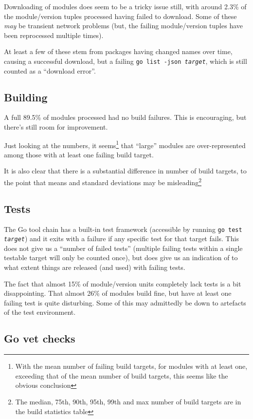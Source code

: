 \documentclass[a4paper]{paper}
\begin{document}
Downloading of modules does seem to be a tricky issue still, with
around 2.3\% of the module/version tuples processed having failed to
download. Some of these {\em may} be transient network problems (but, the
failing module/version tuples have been reprocessed multiple times).

At least a few of these stem from packages having changed names over
time, causing a successful download, but a failing {\tt go list -json
  {\it target}}, which is still counted as a ``download error''.

\subsection{Building}

A full 89.5\% of modules processed had no build failures. This is
encouraging, but there's still room for improvement.

Just looking at the numbers, it seems\footnote{With the mean number of
  failing build targets, for modules with at least one, exceeding that
  of the mean number of build targets, this seems like the obvious
  conclusion} that ``large'' modules are over-represented among those
with at least one failing build target.

It is also clear that there is a substantial difference in number of
build targets, to the point that means and standard deviations may be
misleading\footnote{The median, 75th, 90th, 95th, 99th and max number of build targets are in the build statistics table}

\subsection{Tests}

The Go tool chain has a built-in test framework (accessible by running
{\tt go test {\it target}}) and it exits with a failure if any
specific test for that target fails. This does not give us a ``number
of failed tests'' (multiple failing tests within a single testable
target will only be counted once), but does give us an indication of
to what extent things are released (and used) with failing tests.

The fact that almost 15\% of module/version units completely lack
tests is a bit disappointing. That almost 26\% of modules build fine,
but have at least one failing test is quite disturbing. Some of this
may admittedly be down to artefacts of the test environment.

\subsection{Go vet checks}
\end{document}
